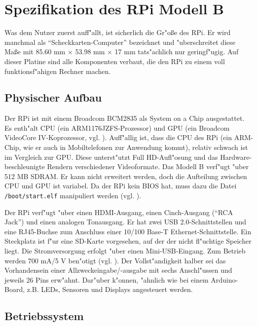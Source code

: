 \section{Spezifikation des RPi Modell B}\label{RPi-Spezi}

Was dem Nutzer zuerst auff"allt, ist sicherlich die Gr"o\ss e des RPi. Er wird manchmal als "`Scheckkarten-Computer"' bezeichnet und "uberschreitet diese Ma\ss e mit 85.60 mm $\times$ 53.98 mm $\times$ 17 mm tats"achlich nur geringf"ugig. Auf dieser Platine sind alle Komponenten verbaut, die den RPi zu einem voll funktionsf"ahigen Rechner machen.

\subsection{Physischer Aufbau}\label{RPi-Hardware}

Der RPi ist mit einem Broadcom BCM2835 als System on a Chip ausgestattet. Es enth"alt CPU (ein ARM1176JZFS-Prozessor) und GPU (ein Broadcom VideoCore IV-Koprozessor, vgl. \cite{scrguide02}). Auff"allig ist, dass die CPU des RPi (ein ARM-Chip, wie er auch in Mobiltelefonen zur Anwendung kommt), relativ schwach ist im Vergleich zur GPU. Diese unterst"utzt Full HD-Aufl"osung und das Hardware-beschleunigte Rendern verschiedener Videoformate. Das Modell B verf"ugt "uber 512 MB SDRAM. Er kann nicht erweitert werden, doch die Aufteilung zwischen CPU und GPU ist variabel. Da der RPi kein BIOS hat, muss dazu die Datei \texttt{/boot/start.elf} manipuliert werden (vgl. \cite{pow12}).

Der RPi verf"ugt "uber einen HDMI-Ausgang, einen Cinch-Ausgang ("`RCA Jack"') und einen analogen Tonausgang. Er hat zwei USB 2.0-Schnittstellen und eine RJ45-Buchse zum Anschluss einer 10/100 Base-T Ethernet-Schnittstelle. Ein Steckplatz ist f"ur eine SD-Karte vorgesehen, auf der der nicht fl"uchtige Speicher liegt. Die Stromversorgung erfolgt "uber einen Mini-USB-Eingang. Zum Betrieb werden 700 mA/5 V ben"otigt (vgl. \cite{pow12}). Der Vollst"andigkeit halber sei das Vorhandensein einer Allzweckeingabe/-ausgabe mit sechs Anschl"ussen und jeweils 26 Pins erw"ahnt. Dar"uber k"onnen, "ahnlich wie bei einem Arduino-Board, z.B. LEDs, Sensoren und Displays angesteuert werden. 


\subsection{Betriebssystem}\label{RPi-OS}

